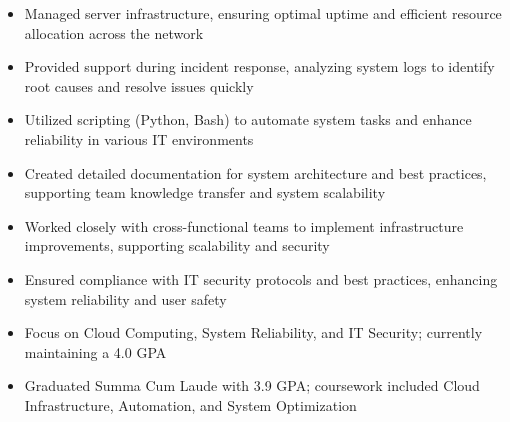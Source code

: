 \par\smallskip
\noindent
\begin{minipage}{20cm}
  \begin{minipage}{9.75cm}
    \begin{itemize}
      \item Managed server infrastructure, ensuring optimal uptime and efficient resource allocation across the network
      \item Provided support during incident response, analyzing system logs to identify root causes and resolve issues quickly
      \item Utilized scripting (Python, Bash) to automate system tasks and enhance reliability in various IT environments
    \end{itemize}
  \end{minipage}
  \hfill
  \begin{minipage}{9.75cm}
    \begin{itemize}
      \item Created detailed documentation for system architecture and best practices, supporting team knowledge transfer and system scalability
      \item Worked closely with cross-functional teams to implement infrastructure improvements, supporting scalability and security
      \item Ensured compliance with IT security protocols and best practices, enhancing system reliability and user safety
    \end{itemize}
  \end{minipage}
\end{minipage}

\begin{itemize}
  \item Focus on Cloud Computing, System Reliability, and IT Security; currently maintaining a 4.0 GPA
\end{itemize}
\divider

\begin{itemize}
  \item Graduated Summa Cum Laude with 3.9 GPA; coursework included Cloud Infrastructure, Automation, and System Optimization
\end{itemize}

\noindent
\begin{minipage}{20cm}
     
      
    
    
\end{minipage}


